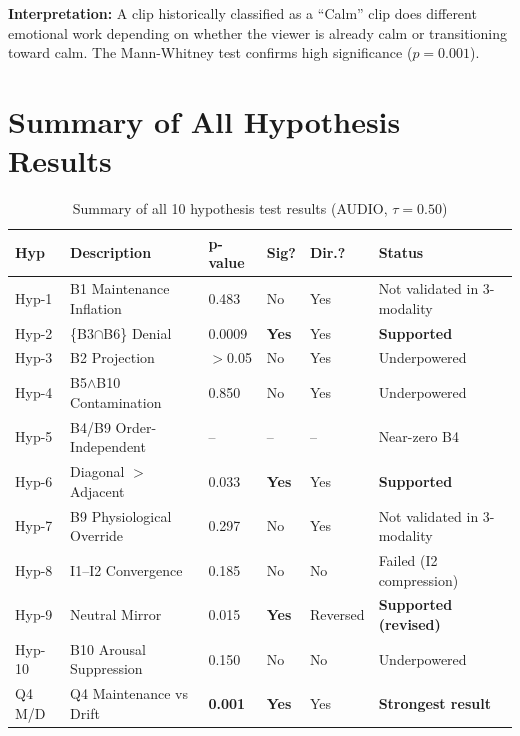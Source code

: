 \documentclass[11pt, a4paper]{report}
\begin{document}
\textbf{Interpretation:} A clip historically classified as a ``Calm'' clip does different emotional work depending on whether the viewer is already calm or transitioning toward calm. The Mann-Whitney test confirms high significance ($p=0.001$).

\section{Summary of All Hypothesis Results}

\begin{table}[H]
    \centering
    \small
    \caption{Summary of all 10 hypothesis test results (AUDIO, $\tau = 0.50$)}
    \label{tab:hyp-summary}
    \begin{tabular}{@{}llllll@{}}
        \toprule
        \textbf{Hyp} & \textbf{Description} & \textbf{p-value} & \textbf{Sig?} & \textbf{Dir.?} & \textbf{Status} \\
        \midrule
        Hyp-1  & B1 Maintenance Inflation & 0.483 & No & Yes & Not validated in 3-modality \\
        Hyp-2  & \{B3$\cap$B6\} Denial & 0.0009 & \textbf{Yes} & Yes & \textbf{Supported} \\
        Hyp-3  & B2 Projection & $>$0.05 & No & Yes & Underpowered \\
        Hyp-4  & B5$\wedge$B10 Contamination & 0.850 & No & Yes & Underpowered \\
        Hyp-5  & B4/B9 Order-Independent & -- & -- & -- & Near-zero B4 \\
        Hyp-6  & Diagonal $>$ Adjacent & 0.033 & \textbf{Yes} & Yes & \textbf{Supported} \\
        Hyp-7  & B9 Physiological Override & 0.297 & No & Yes & Not validated in 3-modality \\
        Hyp-8  & I1--I2 Convergence & 0.185 & No & No & Failed (I2 compression) \\
        Hyp-9  & Neutral Mirror & 0.015 & \textbf{Yes} & Reversed & \textbf{Supported (revised)} \\
        Hyp-10 & B10 Arousal Suppression & 0.150 & No & No & Underpowered \\
        Q4 M/D & Q4 Maintenance vs Drift & \textbf{0.001} & \textbf{Yes} & Yes & \textbf{Strongest result} \\
        \bottomrule
    \end{tabular}
\end{table}
\end{document}
